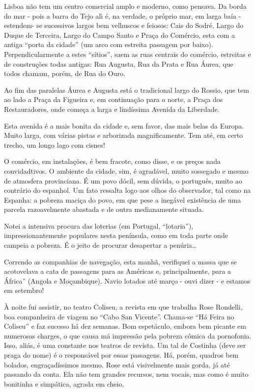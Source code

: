 Lisboa não tem um centro comercial amplo e moderno, como pensava. Da borda do mar - pois a barra do Tejo ali é, na verdade, o próprio mar, em larga baía - estendem- se sucessivos largos bem velhuscos e feiosos: Cais do Sodré, Largo do Duque de Terceira, Largo do Campo Santo e Praça do Comércio, esta com a antiga ``porta da cidade'' (um arco com estreita passagem por baixo). Perpendicularmente a estes ``sítios'', saem as ruas centrais do comércio, estreitas e de construções todas antigas: Rua Augusta, Rua da Prata e Rua Áurea, que todos chamam, porém, de Rua do Ouro.

Ao fim das paralelas Áurea e Augusta está o tradicional largo do Rossio, que tem ao lado a Praça da Figueira e, em continuação para o norte, a Praça dos Restauradores, onde começa a larga e lindíssima Avenida da Liberdade.

Esta avenida é a mais bonita da cidade e, sem favor, das mais belas da Europa. Muito larga, com várias pistas e arborizada magnificamente. Tem até, em certo trecho, um longo lago com cisnes!

O comércio, em instalações, é bem fracote, como disse, e os preços nada convidadtivos. O ambiente da cidade, sim, é agradável, muito sossegado e mesmo de atmosfera provinciana. É um povo dócil, sem dúvida, o português, muito ao contrário do espanhol. Um fato ressalta logo aos olhos do observador, tal como na Espanha: a pobreza maciça do povo, em que pese a inegável existência de uma parcela razoavelmente abastada e de outra medianamente situada.

Notei a intensiva procura das loterias (em Portugal, ``lotaria''), impressionantemente populares nesta península, como em toda parte onde campeia a pobreza. É o jeito de procurar desapertar a penúria\ldots

Correndo as companhias de navegação, esta manhã, verifiquei a massa que se acotovelava a cata de passagens para as Américas e, principalmente, para a África'' (Angola e Moçambique). Navio lotados até março - ouvi dizer - e estamos em setembro!

À noite fui assistir, no teatro Coliseu, a revista em que trabalha Rose Rondelli, boa companheira de viagem no ``Cabo San Vicente''. Chama-se ``Há Feira no Coliseu'' e faz sucesso há dez semanas. Bom espetáculo, embora bem picante em numerosas charges, o que causa má impressão pela pobreza cômica da pornofonia. Isso, aliás, é uma constante nos teatros de revista. Um tal de Costinha (deve ser praga do nome) é o responsável por essas passagens. Há, porém, quadros bem bolados, engraçadíssimos mesmo. Rose está visivelmente mais gorda, já até passando da conta. Ela não tem grandes recursos, nem vocais, mas como é muito bonitinha e simpática, agrada em cheio.

